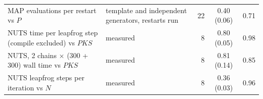 \begin{table}[htbp]
\begin{tabular}{@{}p{5.2cm}p{4.2cm}rcr@{}}
\parbox[t]{5.2cm}{\raggedright MAP evaluations per restart vs $P$\strut} & \parbox[t]{4.2cm}{\raggedright\footnotesize template and independent generators, restarts run\strut} & 22 & 0.40 (0.06) & 0.71 \\
\parbox[t]{5.2cm}{\raggedright NUTS time per leapfrog step (compile excluded) vs $PKS$\strut} & \parbox[t]{4.2cm}{\raggedright\footnotesize measured\strut} & 8 & 0.80 (0.05) & 0.98 \\
\parbox[t]{5.2cm}{\raggedright NUTS, 2 chains $\times$ (300 + 300) wall time vs $PKS$\strut} & \parbox[t]{4.2cm}{\raggedright\footnotesize measured\strut} & 8 & 0.81 (0.14) & 0.85 \\
\parbox[t]{5.2cm}{\raggedright NUTS leapfrog steps per iteration vs $N$\strut} & \parbox[t]{4.2cm}{\raggedright\footnotesize measured\strut} & 8 & 0.36 (0.03) & 0.96 \\
\bottomrule
\end{tabular}
\end{table}

